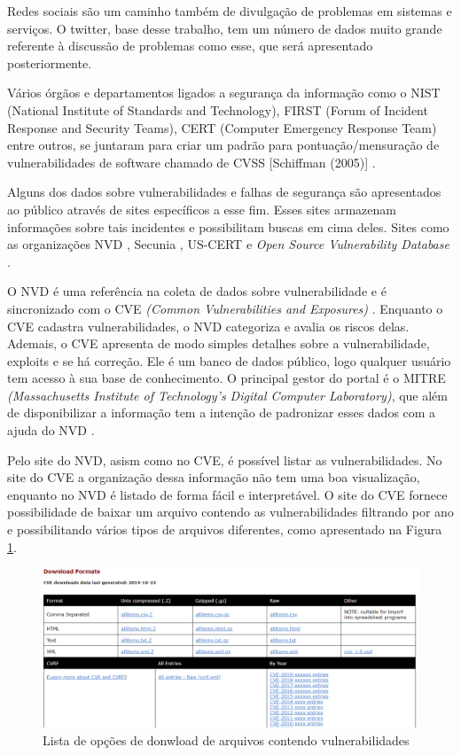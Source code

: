 Redes sociais são um caminho também de divulgação de problemas em sistemas e serviços. O twitter, base desse trabalho, tem um número de dados muito grande referente à discussão de problemas como esse, que será apresentado posteriormente.

Vários órgãos e departamentos ligados a segurança da informação como o NIST (National Institute of Standards and Technology), FIRST (Forum of Incident Response and Security Teams), CERT (Computer Emergency Response Team) entre outros, se juntaram para criar um padrão para pontuação/mensuração de vulnerabilidades de software chamado de CVSS [Schiffman (2005)] \cite{Peotta2006}. 

Alguns dos dados sobre vulnerabilidades e falhas de segurança são apresentados ao público através de sites específicos a esse fim. Esses sites armazenam informações sobre tais incidentes e possibilitam buscas em cima deles. Sites como as organizações NVD \cite{NVD}, Secunia \cite{Secunia2009}, US-CERT \cite{CERT1991} e \textit{Open Source Vulnerability Database} \cite{OSVDB2002}.

O NVD é uma referência na coleta de dados sobre vulnerabilidade e é sincronizado com o CVE \textit{(Common Vulnerabilities and Exposures)} \cite{CVE1985}. Enquanto o CVE cadastra vulnerabilidades, o NVD categoriza e avalia os riscos delas. Ademais, o CVE apresenta de modo simples detalhes sobre a vulnerabilidade, exploits e se há correção. Ele é um banco de dados público, logo qualquer usuário tem acesso à sua base de conhecimento. O principal gestor do portal é o MITRE \textit{(Massachusetts Institute of Technology's Digital Computer Laboratory)}, que além de disponibilizar a informação tem a intenção de padronizar esses dados com a ajuda do NVD \cite{Peotta2006}. 

Pelo site do NVD, asism como no CVE, é possível listar as vulnerabilidades. No site do CVE a organização dessa informação não tem uma boa visualização, enquanto no NVD é listado de forma fácil e interpretável. O site do CVE fornece possibilidade de baixar um arquivo contendo as vulnerabilidades filtrando por ano e possibilitando vários tipos de arquivos diferentes, como apresentado na Figura \ref{fig:cve1}.

\begin{figure}[H]
\centering
\includegraphics[width=1\textwidth]{imagens/cve_exemplo1.png}
\caption{Lista de opções de donwload de arquivos contendo vulnerabilidades}
\label{fig:cve1}
\end{figure}


